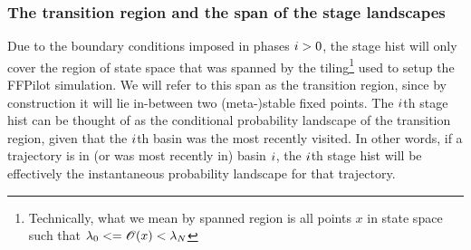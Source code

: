 \subsubsection{The transition region and the span of the stage landscapes}
Due to the boundary conditions imposed in phases $i>0$, the stage hist will only cover the region of state space that was spanned by the tiling\footnote{Technically, what we mean by spanned region is all points $x$ in state space such that $\lambda_0 <= \mathscr{O}(x) < \lambda_N$} used to setup the FFPilot simulation. We will refer to this span as the transition region, since by construction it will lie in-between two (meta-)stable fixed points. The $i$th stage hist can be thought of as the conditional probability landscape of the transition region, given that the $i$th basin was the most recently visited. In other words, if a trajectory is in (or was most recently in) basin $i$, the $i$th stage hist will be effectively the instantaneous probability landscape for that trajectory.

